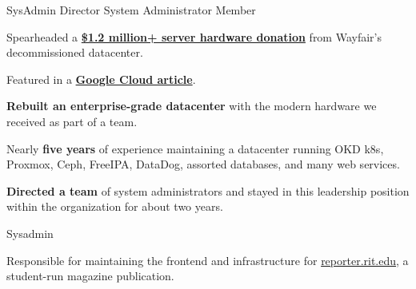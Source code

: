 \vspace{1.5pt} %


\cvtag{\LaTeX}

\smallskip


{
  {SysAdmin Director}    \hfill{}\newline
  {System Administrator} \hfill{}\newline
  {Member}               \hfill{}\newline
}
{
  \item{Spearheaded a \href{https://www.rit.edu/news/wayfair-gifts-850000-servers-rits-computer-science-house}{\textbf{\$1.2 million+ server hardware donation}} from Wayfair's decommissioned datacenter.}
  \item{Featured in a \href{https://cloud.google.com/blog/transform/wayfair-server-donation-mass-open-cloud-rit-student-innovation-johonnot}{\textbf{Google Cloud article}}.}
  \item{\textbf{Rebuilt an enterprise-grade datacenter} with the modern hardware we received as part of a team.}
  \item{Nearly \textbf{five years} of experience maintaining a datacenter running OKD k8s, Proxmox, Ceph, FreeIPA, DataDog, assorted databases, and many web services.}
  \item{\textbf{Directed a team} of system administrators and stayed in this leadership position within the organization for about two years.}
}

{
  {Sysadmin} \hfill{}\newline
}
{
  \item{Responsible for maintaining the frontend and infrastructure for \href{https://reporter.rit.edu}{reporter.rit.edu}, a student-run magazine publication.}
}

